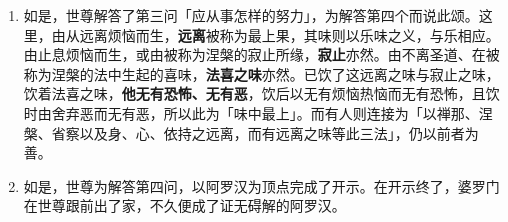 \begin{enumerate}\item 如是，世尊解答了第三问「应从事怎样的努力」，为解答第四个而说此颂。这里，由从远离烦恼而生，\textbf{远离}被称为最上果，其味则以乐味之义，与乐相应。由止息烦恼而生，或由被称为涅槃的寂止所缘，\textbf{寂止}亦然。由不离圣道、在被称为涅槃的法中生起的喜味，\textbf{法喜之味}亦然。已饮了这远离之味与寂止之味，饮着法喜之味，\textbf{他无有恐怖、无有恶}，饮后以无有烦恼热恼而无有恐怖，且饮时由舍弃恶而无有恶，所以此为「味中最上」。而有人则连接为「以禅那、涅槃、省察以及身、心、依持之远离，而有远离之味等此三法」，仍以前者为善。
\item 如是，世尊为解答第四问，以阿罗汉为顶点完成了开示。在开示终了，婆罗门在世尊跟前出了家，不久便成了证无碍解的阿罗汉。\end{enumerate}

